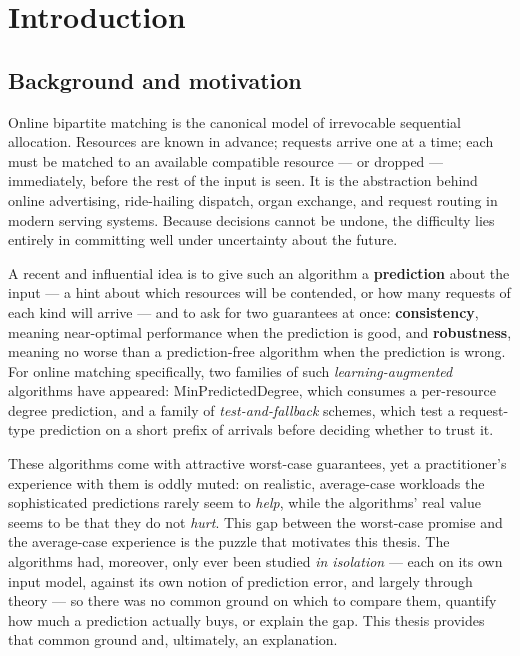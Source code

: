 \chapter{Introduction}\label{introduction}

\section{Background and motivation}\label{background-and-motivation}

Online bipartite matching is the canonical model of irrevocable sequential allocation.
Resources are known in advance; requests arrive one at a time; each must be matched to an
available compatible resource --- or dropped --- immediately, before the rest of the input is
seen. It is the abstraction behind online advertising, ride-hailing dispatch, organ
exchange, and request routing in modern serving systems. Because decisions cannot be undone,
the difficulty lies entirely in committing well under uncertainty about the future.

A recent and influential idea is to give such an algorithm a \textbf{prediction} about the input
--- a hint about which resources will be contended, or how many requests of each kind will
arrive --- and to ask for two guarantees at once: \textbf{consistency}, meaning near-optimal
performance when the prediction is good, and \textbf{robustness}, meaning no worse than a
prediction-free algorithm when the prediction is wrong. For online matching specifically,
two families of such \emph{learning-augmented} algorithms have appeared: MinPredictedDegree,
which consumes a per-resource degree prediction, and a family of \emph{test-and-fallback}
schemes, which test a request-type prediction on a short prefix of arrivals before deciding
whether to trust it.

These algorithms come with attractive worst-case guarantees, yet a practitioner's
experience with them is oddly muted: on realistic, average-case workloads the sophisticated
predictions rarely seem to \emph{help}, while the algorithms' real value seems to be that they do
not \emph{hurt}. This gap between the worst-case promise and the average-case experience is the
puzzle that motivates this thesis. The algorithms had, moreover, only ever been studied \emph{in
isolation} --- each on its own input model, against its own notion of prediction error, and
largely through theory --- so there was no common ground on which to compare them, quantify
how much a prediction actually buys, or explain the gap. This thesis provides that common
ground and, ultimately, an explanation.

